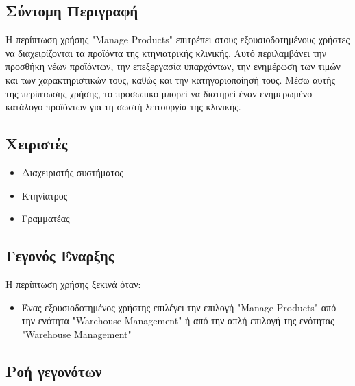 \documentclass[12pt,a4paper,twoside]{book}
\begin{document}
\subsection{Σύντομη Περιγραφή}
Η περίπτωση χρήσης "Manage Products" επιτρέπει στους εξουσιοδοτημένους χρήστες να διαχειρίζονται τα προϊόντα της κτηνιατρικής κλινικής. Αυτό περιλαμβάνει την προσθήκη νέων προϊόντων, την επεξεργασία υπαρχόντων, την ενημέρωση των τιμών και των χαρακτηριστικών τους, καθώς και την κατηγοριοποίησή τους. Μέσω αυτής της περίπτωσης χρήσης, το προσωπικό μπορεί να διατηρεί έναν ενημερωμένο κατάλογο προϊόντων για τη σωστή λειτουργία της κλινικής. %

\subsection{Χειριστές}
\begin{itemize}
  \item Διαχειριστής συστήματος
  \item Κτηνίατρος
  \item Γραμματέας
\end{itemize}

\subsection{Γεγονός Έναρξης}
Η περίπτωση χρήσης ξεκινά όταν:
\begin{itemize}
  \item Ένας εξουσιοδοτημένος χρήστης επιλέγει την επιλογή "Manage Products" από την ενότητα "Warehouse Management" ή από την απλή επιλογή της ενότητας "Warehouse Management" %
\end{itemize}

\subsection{Ροή γεγονότων}
\end{document}
